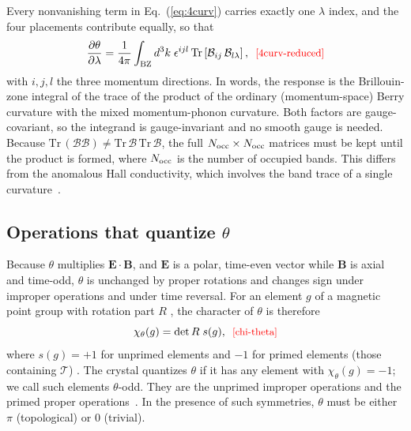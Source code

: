 \documentclass[galley,aps,pra,10pt,amsmath,amssymb,
    superscriptaddress,nofootinbib,longbibliography]{revtex4-2}
\def\Red#1{\textcolor{red}{#1}}
\newcounter{comm}
\def\commnext{\stepcounter{comm}}
\def\commtext{{\bf\color{blue}[\arabic{comm}]}}
\def\commmar{{\bf\color{blue}[\arabic{comm}]}}
\def\aum#1{\commnext\marginpar{\small AU\commmar: #1}\commtext}
\newcommand{\eqlab}[1]{\Red{\hbox{\small\;\;[#1]}}\label{eq:#1}}
\def\aum#1{}
\newcommand{\eqlab}[1]{\label{eq:#1}}
\newcommand{\eq}[1]{Eq.~(\ref{eq:#1})}
\newcommand{\Tr}{\mathrm{Tr}\,}
\newcommand{\BB}{\mathcal{B}}              %
\begin{document}
Every nonvanishing term in \eq{4curv} carries exactly one $\lambda$ index, and the four placements contribute equally, so that
\begin{equation}
\frac{\partial\theta}{\partial\lambda}
=\frac{1}{4\pi}\int_{\rm BZ}d^3k\;\epsilon^{ijl}\,\Tr\!\left[\BB_{ij}\,\BB_{l\lambda}\right],
\eqlab{4curv-reduced}
\end{equation}
with $i,j,l$ the three momentum directions.
In words, the response is the Brillouin-zone integral of the trace of the product of the ordinary (momentum-space) Berry curvature with the mixed momentum-phonon curvature.
Both factors are gauge-covariant, so the integrand is gauge-invariant and no smooth gauge is needed.
Because $\Tr(\BB\BB)\neq\Tr\BB\,\Tr\BB$, the full $N_{\rm occ}\times N_{\rm occ}$ matrices must be kept until the product is formed, where $N_{\rm occ}$ is the number of occupied bands.
This differs from the anomalous Hall conductivity, which involves the band trace of a single curvature~\cite{wang2006abinitio}.

\subsection{\texorpdfstring{Operations that quantize $\theta$}{Operations that quantize theta}}

Because $\theta$ multiplies $\mathbf E\cdot\mathbf B$, and $\mathbf E$ is a polar, time-even vector while $\mathbf B$ is axial and time-odd, $\theta$ is unchanged by proper rotations and changes sign under improper operations and under time reversal.
For an element $g$ of a magnetic point group with rotation part $R$ \aum{Would it be ok to add (proper or improper)? I am worried that $R$ could be interpreted as a proper rotation only.}, the character of $\theta$ is therefore
\begin{equation}
\chi_\theta(g)=\det R\;s(g),
\eqlab{chi-theta}
\end{equation}
where $s(g)=+1$ for unprimed elements and $-1$ for primed elements (those containing $\mathcal T$) \aum{As a possible alternative, we can call these ``unitary'' and ``anti-unitary'' instead of ``unprimed'' and ``primed'' -- I don't know if this is somewhat better.}.
The crystal quantizes $\theta$ if it has any element with $\chi_\theta(g)=-1$; we call such elements $\theta$-odd. They are the unprimed improper operations and the primed proper operations~\cite{varnava2020axion,seleznev2023towards}. In the presence of such symmetries, $\theta$ must be either $\pi$ (topological) or $0$ (trivial).
\end{document}

